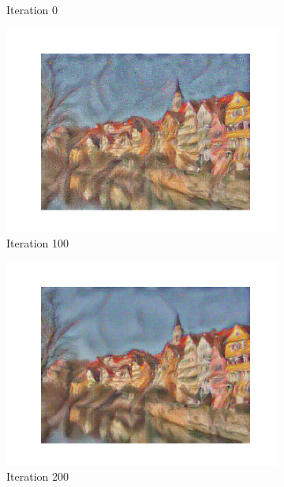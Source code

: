 \documentclass[12pt]{article}
\begin{document}
\begin{figure}[htbp]
\begin{subfigure}[t]{0.48\textwidth}
        \caption{Iteration 0}
    \label{hw2p2b}
    \end{subfigure}
    \begin{subfigure}[t]{0.48\textwidth}
        \centering
        \includegraphics[trim={3in 0in 3in 0in},scale=0.5]{./Homework2/output/hw2p2_fig03.png}
        \caption{Iteration 100}
    \label{hw2p2c}
    \end{subfigure}
    \begin{subfigure}[t]{0.48\textwidth}
        \centering
        \includegraphics[trim={3in 0in 3in 0in},scale=0.5]{./Homework2/output/hw2p2_fig04.png}
        \caption{Iteration 200}
    \label{hw2p2d}
    \end{subfigure}
    \begin{subfigure}[t]{0.48\textwidth}

\end{subfigure}
\end{figure}
\end{document}
